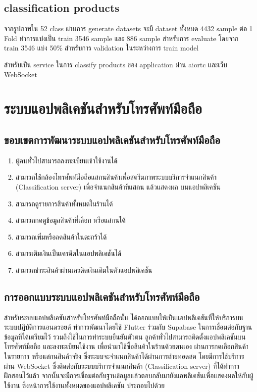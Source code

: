 \subsection{classification products}
จากรูปภาพใน 52 class ผ่านการ generate datasets จะมี dataset ทั้งหมด 4432 sample ต่อ 1 Fold
ทำการแบ่งเป็น train 3546 sample และ  886 sample สำหรับการ evaluate
โดยจาก train 3546 แบ่ง 50\% สำหรับการ validation ในระหว่างการ train model

สำหรับเป็น service ในการ classify products ของ application ผ่าน aiortc  และเว็บ WebSocket



\newpage

\section{ระบบแอปพลิเคชันสำหรับโทรศัพท์มือถือ}
\subsection{ขอบเขตการพัฒนาระบบแอปพลิเคชันสำหรับโทรศัพท์มือถือ}
\begin{enumerate}
  \item ผู้คนทั่วไปสามารถลงทะเบียนเข้าใช้งานได้
  \item สามารถใช้กล้องโทรศัพท์มือถือแสกนสินค้าเพื่อสตรีมภาพระบบบริการจำแนกสินค้า (Classification server) เพื่อจำแนกสินค้าที่แสกน แล้วแสดงผล บนแอปพลิเคชัน
  \item สามารถดูรายการสินค้าทั้งหมดในร้านได้
  \item สามารถกดดูข้อมูลสินค้าที่เลือก หรือแสกนได้
  \item สามารถเพิ่มหรือลดสินค้าในตะกร้าได้
  \item สามารเติมเงินเป็นเครดิตในแอปพลิเคชันได้
  \item สามารถชําระสินค้าผ่านเครดิตเงินเติมในตัวแอปพลิเคชัน

\end{enumerate}

\subsection{การออกแบบระบบแอปพลิเคชันสำหรับโทรศัพท์มือถือ}
สำหรับระบบแอปพลิเคชันสำหรับโทรศัพท์มือถือนั้น ได้ออกแบบให้เป็นแอปพลิเคชันที่ให้บริการบนระบบปฏิบัติการแอนดรอยด์ ทำการพัฒนาโดยใช้ Flutter ร่วมกับ Supabase ในการเชื่อมต่อกับฐานข้อมูลที่ได้เตรียมไว้ รวมถึงใช้ในการทำระบบยืนยันตัวตน ลูกค้าทั่วไปสามารถติดตั้งแอปพลิเคชันบนโทรศัพท์มือถือ และลงทะเบียนใช้งาน เพื่อนำมาใช้ซื้อสินค้าในร้านด้วยตนเอง ผ่านการกดเลือกสินค้าในรายการ หรือแสกนสินค้าจริง ซึ่งระบบจะจำแนกสินค้าได้ผ่านการถ่ายทอดสด โดยมีการใช้บริการผ่าน WebSocket ซึ่งติดต่อกับระบบบริการจำแนกสินค้า (Classification server) ที่ได้ทำการฝึกสอนไว้แล้ว จากนั้นจะมีการเชื่อมต่อกับฐานข้อมูลแล้วตอบกลับมายังแอพลิเคชันเพื่อแสดงผลให้กับผู้ใช้งาน ซึ่งหน้าการใช้งานทั้งหมดของแอปพลิเคชัน ประกอบไปด้วย

